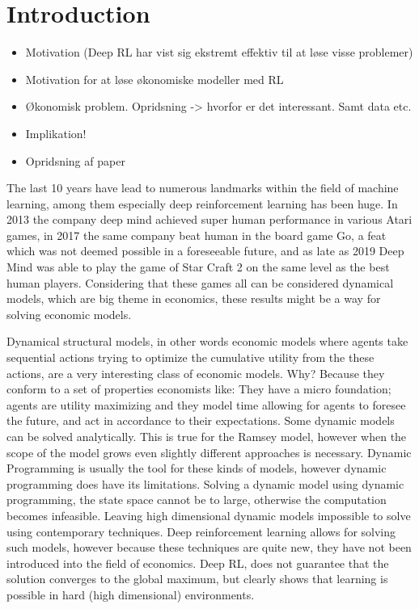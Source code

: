 \section{Introduction} 

\begin{itemize}
    \item Motivation (Deep RL har vist sig ekstremt effektiv til at løse visse problemer)
    \item Motivation for at løse økonomiske modeller med RL
    \item Økonomisk problem. Opridsning -> hvorfor er det interessant. Samt data etc.
    \item Implikation!
    \item Opridsning af paper
\end{itemize}

The last 10 years have lead to numerous landmarks within the field of machine learning, among them especially deep reinforcement learning has been huge. In 2013 the company deep mind achieved super human performance in various Atari games, in 2017 the same company beat human in the board game Go, a feat which was not deemed possible in a foreseeable future, and as late as 2019 Deep Mind was able to play the game of Star Craft 2 on the same level as the best human players. Considering that these games all can be considered dynamical models, which are big theme in economics, these results might be a way for solving economic models.

Dynamical structural models, in other words economic models where agents take sequential actions trying to optimize the cumulative utility from the these actions, are a very interesting class of economic models. Why? Because they conform to a set of properties economists like: They have a micro foundation; agents are utility maximizing and they model time allowing for agents to foresee the future, and act  in accordance to their expectations. Some dynamic models can be solved  analytically. This is true for the Ramsey model, however when the scope of the model grows even slightly different approaches is necessary. Dynamic Programming is usually the tool for these kinds of models, however dynamic programming does have its limitations. Solving a dynamic model using dynamic programming, the state space cannot be to large, otherwise the computation becomes infeasible. Leaving high dimensional dynamic models impossible to solve using contemporary techniques. Deep reinforcement learning allows for solving such models, however because these techniques are quite new, they have not been introduced into the field of economics. Deep RL, does not guarantee that the solution converges to the global maximum, but clearly shows that learning is possible in hard (high dimensional) environments.

